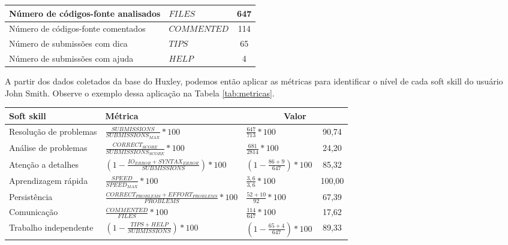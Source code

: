 \begin{table*}[ht]
\begin{tabular}{|p{9cm}|l|c|}
				Número de códigos-fonte analisados										& $ FILES$ 										& 647		\\\hline
				Número de códigos-fonte comentados										& $ COMMENTED$ 								& 114		\\\hline
				
				Número de submissões com dica													& $ TIPS$ 										& 65		\\\hline
				Número de submissões com ajuda												& $ HELP$ 										& 4			\\\hline
				
					
     \end{tabular}
		\label{tab:dadosmetricas}
\end{table*}

A partir dos dados coletados da base do Huxley, podemos então aplicar as métricas para identificar o nível de cada soft skill do usuário John Smith. Observe o exemplo dessa aplicação na Tabela \ref{tab:metricas}.

\begin{table*}[ht]
\footnotesize
\caption{\small Métricas para identificar o nível das softs skills}
\addtolength{\tabcolsep}{-3.5pt}
\renewcommand{\arraystretch}{1.7} 
\centering

		\begin{tabular}{|p{4cm}|p{7cm}|p{3cm}|c|}\hline
		
        \textbf{Soft skill} & \textbf{Métrica} & \multicolumn{2}{c|}{\textbf{Valor}} \\\hline
													
				Resolução de problemas & $\frac{SUBMISSIONS}{SUBMISSIONS_{MAX}} * 100$
															 & $\frac{647}{713} * 100$ & 90,74 \\\hline
				
				Análise de problemas & $\frac{CORRECT_{SCORE}}{SUBMISSIONS_{SCORE}} * 100$
														 & $\frac{681}{2814} * 100$ & 24,20 \\\hline
				
				Atenção a detalhes & $\left(1 - \frac {IO_{ERROR} + SYNTAX_{ERROR}}{SUBMISSIONS}\right) * 100$
													 & $\left(1 - \frac {86 + 9}{647}\right) * 100$ & 85,32 \\\hline
				
				Aprendizagem rápida & $\frac{SPEED}{SPEED_{MAX}} * 100$
														& $\frac{3,6}{3,6} * 100$ & 100,00 \\\hline
				
				Persistência & $\frac{CORRECT_{PROBLEMS} + EFFORT_{PROBLEMS}}{PROBLEMS} * 100$
										 & $\frac{52 + 10}{92} * 100$ & 67,39 \\\hline
				
				Comunicação & $\frac{COMMENTED}{FILES} * 100$
										& $\frac{114}{647} * 100$ & 17,62	\\\hline
				
				Trabalho independente & $\left(1 - \frac {TIPS + HELP}{SUBMISSIONS}\right) * 100$
															& $\left(1 - \frac {65 + 4}{647}\right) * 100$ & 89,33 \\\hline
													
    \end{tabular}
		\label{tab:metricas}
\end{table*}